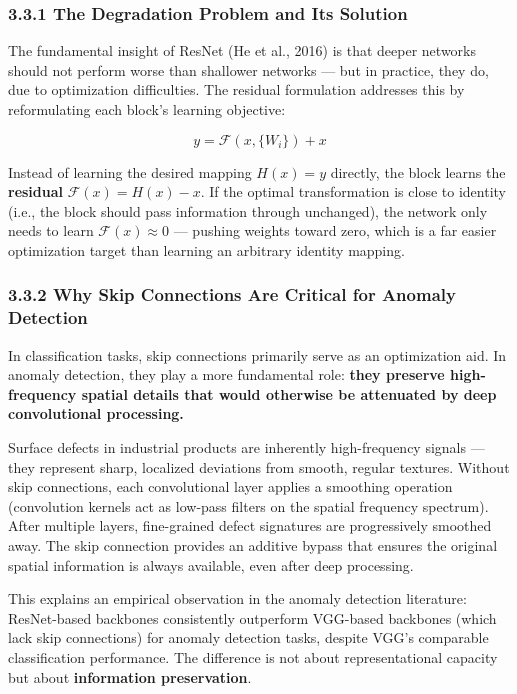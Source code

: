 \documentclass[12pt, a4paper, oneside]{report}
\begin{document}
\subsubsection{3.3.1 The Degradation Problem and Its Solution}\label{the-degradation-problem-and-its-solution}

The fundamental insight of ResNet (He et al., 2016) is that deeper networks should not perform worse than shallower networks --- but in practice, they do, due to optimization difficulties. The residual formulation addresses this by reformulating each block's learning objective:

\[y = \mathcal{F}(x, \{W_i\}) + x\]

Instead of learning the desired mapping \(H(x) = y\) directly, the block learns the \textbf{residual} \(\mathcal{F}(x) = H(x) - x\). If the optimal transformation is close to identity (i.e., the block should pass information through unchanged), the network only needs to learn \(\mathcal{F}(x) \approx 0\) --- pushing weights toward zero, which is a far easier optimization target than learning an arbitrary identity mapping.

\subsubsection{3.3.2 Why Skip Connections Are Critical for Anomaly Detection}\label{why-skip-connections-are-critical-for-anomaly-detection}

In classification tasks, skip connections primarily serve as an optimization aid. In anomaly detection, they play a more fundamental role: \textbf{they preserve high-frequency spatial details that would otherwise be attenuated by deep convolutional processing.}

Surface defects in industrial products are inherently high-frequency signals --- they represent sharp, localized deviations from smooth, regular textures. Without skip connections, each convolutional layer applies a smoothing operation (convolution kernels act as low-pass filters on the spatial frequency spectrum). After multiple layers, fine-grained defect signatures are progressively smoothed away. The skip connection provides an additive bypass that ensures the original spatial information is always available, even after deep processing.

This explains an empirical observation in the anomaly detection literature: ResNet-based backbones consistently outperform VGG-based backbones (which lack skip connections) for anomaly detection tasks, despite VGG's comparable classification performance. The difference is not about representational capacity but about \textbf{information preservation}.
\end{document}

